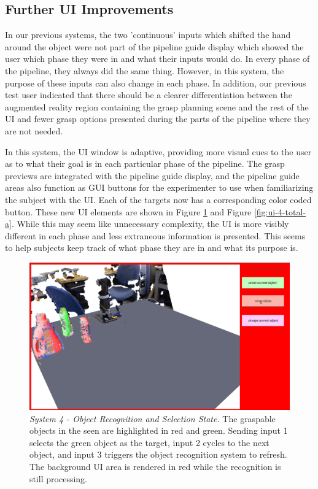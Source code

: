 \subsection{Further UI Improvements}
In our previous systems, the two 'continuous' inputs which shifted the hand around the object were not part of the pipeline guide display which showed the user which phase they were in and what their inputs would do. In every phase of the pipeline, they always did the same thing. However, in this system, the purpose of these inputs can also change in each phase. In addition, our previous test user indicated that there should be a clearer differentiation between the augmented reality region containing the grasp planning scene and the rest of the UI and fewer grasp options presented during the parts of the pipeline where they are not needed.

In this system, the UI window is adaptive, providing more visual cues to the user as to what their goal is in each particular phase of the pipeline. The grasp previews are integrated with the pipeline guide display, and the pipeline guide areas also function as GUI buttons for the experimenter to use when familiarizing the subject with the UI. Each of the targets now has a corresponding color coded button. These new UI elements are shown in Figure \ref{fig:ui-4-object-selection} and Figure \ref{fig:ui-4-total-a}. While this may seem like unnecessary complexity, the UI is more visibly different in each phase and less extraneous information is presented. This seems to help subjects keep track of what phase they are in and what its purpose is. 

\begin{figure}
\centering
\includegraphics[width=.9\columnwidth]{images_4/object_recognition_state.png}
\caption{\emph{System 4 - Object Recognition and Selection State.} The graspable objects in the seen are highlighted in red and green. Sending input 1 selects the green object as the target, input 2 cycles to the next object, and input 3 triggers the object recognition system to refresh.   The background UI area is rendered in red while the recognition is still processing.}
\label{fig:ui-4-object-selection}
\end{figure}

